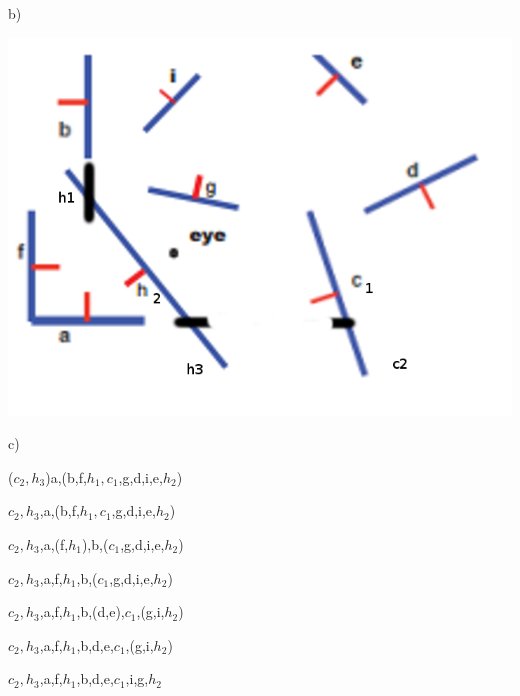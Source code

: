 \documentclass[12pt,a4paper]{article}
\begin{document}
b)

\includegraphics[scale=0.5]{question4}


c)

($c_2, h_3$)a,(b,f,$h_1,c_1$,g,d,i,e,$h_2$)

$c_2,h_3$,a,(b,f,$h_1,c_1$,g,d,i,e,$h_2$)

$c_2,h_3$,a,(f,$h_1$),b,($c_1$,g,d,i,e,$h_2$)

$c_2,h_3$,a,f,$h_1$,b,($c_1$,g,d,i,e,$h_2$)

$c_2,h_3$,a,f,$h_1$,b,(d,e),$c_1$,(g,i,$h_2$)

$c_2,h_3$,a,f,$h_1$,b,d,e,$c_1$,(g,i,$h_2$)

$c_2,h_3$,a,f,$h_1$,b,d,e,$c_1$,i,g,$h_2$
\end{document}
